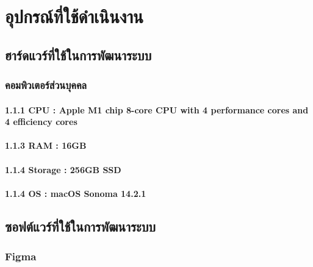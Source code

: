 \hspace{0cm}\section{อุปกรณ์ที่ใช้ดำเนินงาน}

\hspace{0cm}\subsection{ฮาร์ดแวร์ที่ใช้ในการพัฒนาระบบ}

\hspace{1cm}\subsubsection{คอมพิวเตอร์ส่วนบุคคล}

\hspace{2.5cm}\hangindent=4.9cm\paragraph{1.1.1 CPU : Apple M1 chip 8-core CPU with 4 perform­ance cores and 4 efficiency cores}

\hspace{2.5cm}\hangindent=4.9cm\paragraph{1.1.3 RAM : 16GB}

\hspace{2.5cm}\hangindent=4.9cm\paragraph{1.1.4 Storage : 256GB SSD}

\hspace{2.5cm}\hangindent=4.9cm\paragraph{1.1.4 OS : macOS Sonoma 14.2.1 }


\hspace{0cm}\subsection{ซอฟต์แวร์ที่ใช้ในการพัฒนาระบบ}

\hspace{1cm}\subsubsection{Figma}

